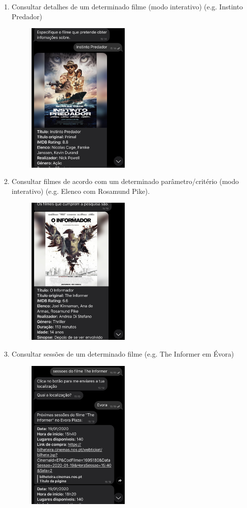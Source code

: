 \documentclass[11pt, a4paper]{article}
\begin{document}
\begin{appendices}
\begin{enumerate}
\begin{figure}[H]
    \end{figure}
    \item Consultar detalhes de um determinado filme (modo interativo) (e.g. Instinto Predador)
    \begin{figure}[H]
        \centering
        \includegraphics[width=5cm]{images/guiaoR/7.jpg}
    \end{figure}
    \item Consultar filmes de acordo com um determinado parâmetro/critério (modo interativo) (e.g. Elenco com Rosamund Pike).
    \begin{figure}[H]
        \centering
        \includegraphics[width=5cm]{images/guiaoR/8.jpg}
    \end{figure}
    \item Consultar sessões de um determinado filme (e.g. The Informer em Évora)
    \begin{figure}[H]
        \centering
        \includegraphics[width=5cm]{images/guiaoR/9.jpg}

\end{figure}
\end{enumerate}
\end{appendices}
\end{document}
